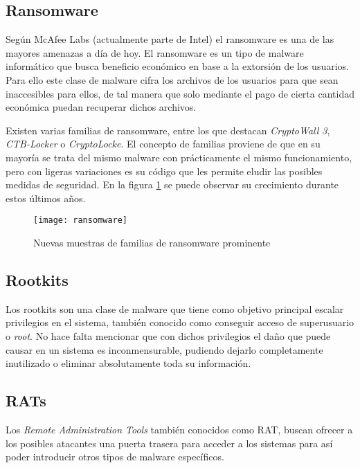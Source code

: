 \subsection{Ransomware}

Según McAfee Labs \cite{mcafee-predictions} (actualmente parte de Intel) el ransomware es una de las mayores amenazas a día de hoy. El ransomware es un tipo de malware informático que busca beneficio económico en base a la extorsión de los usuarios. Para ello este clase de malware cifra los archivos de los usuarios para que sean inaccesibles para ellos, de tal manera que solo mediante el pago de cierta cantidad económica puedan recuperar dichos archivos.

Existen varias familias de ransomware, entre los que destacan \emph{CryptoWall 3}, \emph{CTB-Locker} o \emph{CryptoLocke}. El concepto de familias proviene de que en su mayoría se trata del mismo malware con prácticamente el mismo funcionamiento, pero con ligeras variaciones es su código que les permite eludir las posibles medidas de seguridad. En la figura \ref{fig:ransomware} se puede observar su crecimiento durante estos últimos años.

\begin{figure}[H]
	\centering
	\texttt{[image: ransomware]}
	\caption{Nuevas muestras de familias de ransomware prominente \cite{mcafee-predictions}}
	\label{fig:ransomware}
\end{figure}

\subsection{Rootkits}

Los rootkits son una clase de malware que tiene como objetivo principal escalar privilegios en el sistema, también conocido como conseguir acceso de superusuario o \textit{root}. No hace falta mencionar que con dichos privilegios el daño que puede causar en un sistema es inconmensurable, pudiendo dejarlo completamente inutilizado o eliminar absolutamente toda su información.

\subsection{RATs}

Los \textit{Remote Administration Tools} también conocidos como RAT, buscan ofrecer a los posibles atacantes una puerta trasera para acceder a los sistemas para así poder introducir otros tipos de malware específicos.

